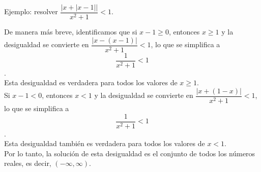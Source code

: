 \documentclass[a4paper,12pt]{article}
\begin{document}
\vspace{1cm}
Ejemplo: resolver $\dfrac{|x+|x-1||}{x^2+1}<1$.\par

\vspace{0.5cm}
De manera más breve, identificamos que si $x-1\geq0$, entonces $x\geq1$ y la desigualdad se convierte en $\dfrac{|x-(x-1)|}{x^2+1}<1$, lo que se simplifica a \[ \dfrac{1}{x^2+1}<1 \]. \\Esta desigualdad es verdadera para todos los valores de $x\geq1$. 
\\Si $x-1<0$, entonces $x<1$ y la desigualdad se convierte en $\dfrac{|x+(1-x)|}{x^2+1}<1$, lo que se simplifica a \[ \dfrac{1}{x^2+1}<1 \].\\ Esta desigualdad también es verdadera para todos los valores de $x<1$. 
\vspace{.5cm}
\\Por lo tanto, la solución de esta desigualdad es el conjunto de todos los números reales, es decir, $(-\infty,\infty)$.
\end{document}
